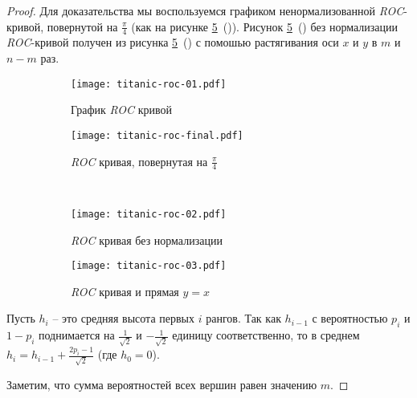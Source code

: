 \begin{proof}
    Для доказательства мы воспользуемся графиком ненормализованной
    \emph{ROC}-кривой, повернутой на $\frac{\pi}{4}$ (как на рисунке
    \ref{fig:lemma}~()).  Рисунок
    \ref{fig:lemma}~() без нормализации
    \emph{ROC}-кривой получен из рисунка
    \ref{fig:lemma}~() с помошью растягивания оси
    $x$ и $y$ в $m$ и $n-m$ раз.
    \begin{figure}
            \begin{subfigure}{.5\textwidth}
                \centering
            \texttt{[image: titanic-roc-01.pdf]}
                \caption{График \emph{ROC} кривой} 
            \label{fig:lemma:roc-start}
        \end{subfigure}%
        \begin{subfigure}{.5\textwidth}
            \centering
            \texttt{[image: titanic-roc-final.pdf]}
            \caption{\emph{ROC} кривая, повернутая на $\frac{\pi}{4}$}
            \label{fig:lemma:roc-rotation}
        \end{subfigure}\\
        \begin{subfigure}{.5\textwidth}
            \centering
            \texttt{[image: titanic-roc-02.pdf]}
            \caption{\emph{ROC} кривая без нормализации}
            \label{fig:lemma:roc-unnorm}
        \end{subfigure}%
        \begin{subfigure}{.5\textwidth}
            \centering
            \texttt{[image: titanic-roc-03.pdf]}
            \caption{\emph{ROC} кривая и прямая $y=x$}
            \label{fig:lemma:roc-idfunc}
        \end{subfigure}
        \centering
        \caption{}
        \label{fig:lemma}%
    \end{figure}

    Пусть $h_i$ -- это средняя высота первых $i$ рангов.  Так как $h_{i-1}$
    с вероятностью $p_i$ и $1-p_i$ поднимается на $\frac{1}{\sqrt{2}}$
    и $-\frac{1}{\sqrt{2}}$ единицу соответственно, то в среднем $h_{i}
    = h_{i-1} + \frac{2p_i-1}{\sqrt{2}}$ (где $h_0=0$).

    Заметим, что сумма вероятностей всех вершин равен значению $m.$


\end{proof}
